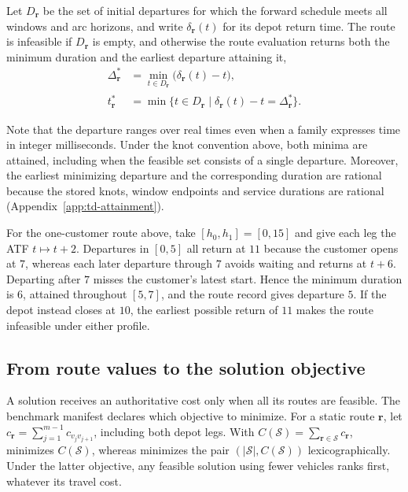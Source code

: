 Let $D_{\mathbf r}$ be the set of initial departures for which the forward schedule meets all windows and arc horizons, and write $\delta_{\mathbf r}(t)$ for its depot return time. The route is infeasible if $D_{\mathbf r}$ is empty, and otherwise the route evaluation returns both the minimum duration and the earliest departure attaining it,
\begin{align}
 \Delta_{\mathbf r}^* &= \min_{t\in D_{\mathbf r}}\bigl(\delta_{\mathbf r}(t)-t\bigr), \label{eq:td-route-duration}\\
 t_{\mathbf r}^* &= \min\{t\in D_{\mathbf r}\mid \delta_{\mathbf r}(t)-t=\Delta_{\mathbf r}^*\}. \label{eq:td-earliest-minimizer}
\end{align}

Note that the departure ranges over real times even when a family expresses time in integer milliseconds. Under the knot convention above, both minima are attained, including when the feasible set consists of a single departure. Moreover, the earliest minimizing departure and the corresponding duration are rational because the stored knots, window endpoints and service durations are rational (Appendix~\ref{app:td-attainment}).

For the one-customer route above, take $[h_0,h_1]=[0,15]$ and give each leg the ATF $t\mapsto t+2$. Departures in $[0,5]$ all return at $11$ because the customer opens at $7$, whereas each later departure through $7$ avoids waiting and returns at $t+6$. Departing after $7$ misses the customer's latest start. Hence the minimum duration is $6$, attained throughout $[5,7]$, and the route record gives departure $5$. If the depot instead closes at $10$, the earliest possible return of $11$ makes the route infeasible under either profile.

\subsection{From route values to the solution objective}

A solution receives an authoritative cost only when all its routes are feasible. The benchmark manifest declares which objective to minimize. For a static route $\mathbf r$, let $c_{\mathbf r}=\sum_{j=1}^{m-1}c_{v_j v_{j+1}}$, including both depot legs. With $C(\mathcal S)=\sum_{\mathbf r\in\mathcal S}c_{\mathbf r}$,  minimizes $C(\mathcal S)$, whereas  minimizes the pair $(|\mathcal S|,C(\mathcal S))$ lexicographically. Under the latter objective, any feasible solution using fewer vehicles ranks first, whatever its travel cost.

